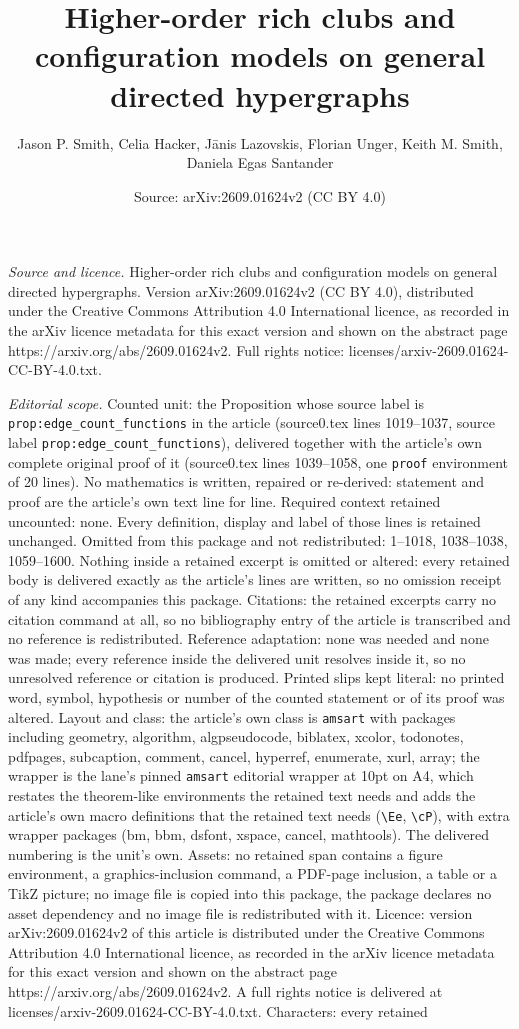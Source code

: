 \documentclass[10pt,a4paper]{amsart}
\title[Higher-order rich clubs and configuration models on general ]{Higher-order rich clubs and configuration models on general directed hypergraphs}
\author{Jason P. Smith, Celia Hacker, J\=anis Lazovskis, Florian Unger, Keith M. Smith, Daniela Egas Santander}
\date{Source: arXiv:2609.01624v2 (CC BY 4.0)}
\begin{document}
\maketitle

\noindent\emph{Source and licence.} Higher-order rich clubs and configuration models on general directed hypergraphs. Version arXiv:2609.01624v2 (CC BY 4.0), distributed under the Creative Commons Attribution 4.0 International licence, as recorded in the arXiv licence metadata for this exact version and shown on the abstract page https://arxiv.org/abs/2609.01624v2. Full rights notice: licenses/arxiv-2609.01624-CC-BY-4.0.txt.\par\smallskip

\noindent\textit{Editorial scope.} Counted unit: the Proposition whose source label is \texttt{prop:edge\_count\_functions} in the article (source0.tex lines 1019--1037, source label \texttt{prop:edge\_count\_functions}), delivered together with the article's own complete original proof of it (source0.tex lines 1039--1058, one \texttt{proof} environment of 20 lines). No mathematics is written, repaired or re-derived: statement and proof are the article's own text line for line. Required context retained uncounted: none. Every definition, display and label of those lines is retained unchanged. Omitted from this package and not redistributed: 1--1018, 1038--1038, 1059--1600. Nothing inside a retained excerpt is omitted or altered: every retained body is delivered exactly as the article's lines are written, so no omission receipt of any kind accompanies this package. Citations: the retained excerpts carry no citation command at all, so no bibliography entry of the article is transcribed and no reference is redistributed. Reference adaptation: none was needed and none was made; every reference inside the delivered unit resolves inside it, so no unresolved reference or citation is produced. Printed slips kept literal: no printed word, symbol, hypothesis or number of the counted statement or of its proof was altered. Layout and class: the article's own class is \texttt{amsart} with packages including geometry, algorithm, algpseudocode, biblatex, xcolor, todonotes, pdfpages, subcaption, comment, cancel, hyperref, enumerate, xurl, array; the wrapper is the lane's pinned \texttt{amsart} editorial wrapper at 10pt on A4, which restates the theorem-like environments the retained text needs and adds the article's own macro definitions that the retained text needs (\texttt{\textbackslash Ee}, \texttt{\textbackslash cP}), with extra wrapper packages (bm, bbm, dsfont, xspace, cancel, mathtools). The delivered numbering is the unit's own. Assets: no retained span contains a figure environment, a graphics-inclusion command, a PDF-page inclusion, a table or a TikZ picture; no image file is copied into this package, the package declares no asset dependency and no image file is redistributed with it. Licence: version arXiv:2609.01624v2 of this article is distributed under the Creative Commons Attribution 4.0 International licence, as recorded in the arXiv licence metadata for this exact version and shown on the abstract page https://arxiv.org/abs/2609.01624v2. A full rights notice is delivered at licenses/arxiv-2609.01624-CC-BY-4.0.txt. Characters: every retained 
\end{document}
